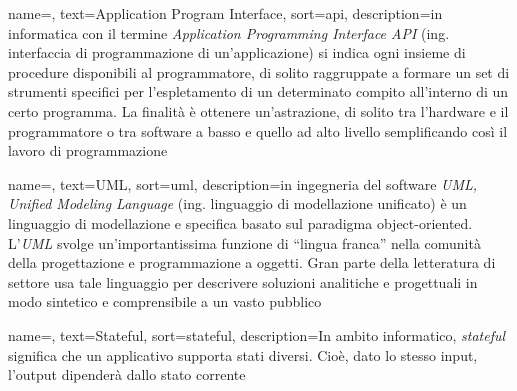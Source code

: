 
\renewcommand{\acronymname}{Acronimi e abbreviazioni}


    
    


{
    name=,
    text=Application Program Interface,
    sort=api,
    description={in informatica con il termine \emph{Application Programming Interface API} (ing. interfaccia di programmazione di un'applicazione) si indica ogni insieme di procedure disponibili al programmatore, di solito raggruppate a formare un set di strumenti specifici per l'espletamento di un determinato compito all'interno di un certo programma. La finalità è ottenere un'astrazione, di solito tra l'hardware e il programmatore o tra software a basso e quello ad alto livello semplificando così il lavoro di programmazione}
}

{
    name=,
    text=UML,
    sort=uml,
    description={in ingegneria del software \emph{UML, Unified Modeling Language} (ing. linguaggio di modellazione unificato) è un linguaggio di modellazione e specifica basato sul paradigma object-oriented. L'\emph{UML} svolge un'importantissima funzione di ``lingua franca'' nella comunità della progettazione e programmazione a oggetti. Gran parte della letteratura di settore usa tale linguaggio per descrivere soluzioni analitiche e progettuali in modo sintetico e comprensibile a un vasto pubblico}
}

{
    name=,
    text=Stateful,
    sort=stateful,
    description={In ambito informatico, \emph{stateful} significa che un applicativo supporta stati diversi. Cioè, dato lo stesso input, l'output dipenderà dallo stato corrente}
}

